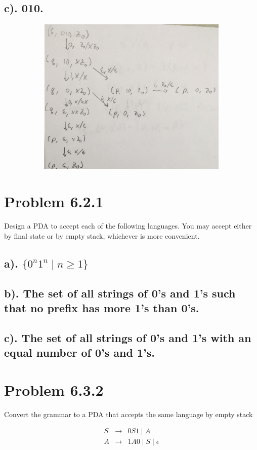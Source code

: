 \documentclass[20pt]{article} %
\begin{document}
\subsection{c). 010.}
\begin{figure}[!htbp]
  	\centering
   	\begin{subfigure}[p]{0.6\linewidth}
    	\includegraphics[width=\linewidth]{./figures/h7-3.jpg}
   	\end{subfigure}
\end{figure} 
\section{Problem 6.2.1}
Design a PDA to accept each of the following languages.  You may accept either by final state or by empty stack, whichever is more convenient.  
\subsection{a). $\{0^{n}1^{n} \mid n \geq 1\}$}
\subsection{b). The set of all strings of 0's and 1's such that no prefix has more 1's than 0's.}
\subsection{c). The set of all strings of 0's and 1's with an equal number of 0's and 1's.}
\section{Problem 6.3.2}
Convert the grammar to a PDA that accepts the same language by empty stack
 \begin{table}[!htbp]
 \[\begin{array}{ccc} 
 S & \rightarrow & 0S1 \mid A \\
 A & \rightarrow & 1A0 \mid S \mid \epsilon \\
 \end{array}\]
 \end{table}
\end{document}
